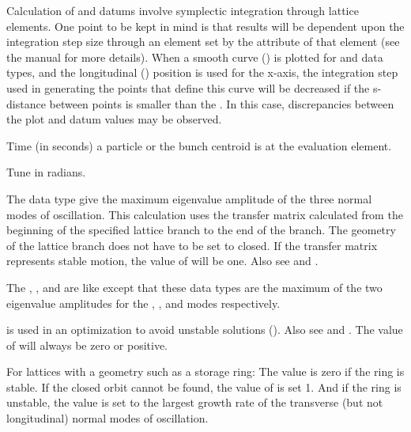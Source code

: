 \begin{description}
{{{{{{{{{Calculation of  and  datums involve symplectic integration
through lattice elements. One point to be kept in mind is that results will be dependent upon the
integration step size through an element set by the  attribute of that element (see the
\bmad manual for more details). When a smooth curve () is plotted for 
and  data types, and the longitudinal () position is used for the
x-axis, the integration step used in generating the points that define this curve will be decreased
if the s-distance between points is smaller than the .  In this case, discrepancies
between the plot and datum values may be observed.

  \item[time] \Newline {}
Time (in seconds) a particle or the bunch centroid is at the evaluation element.

  \item[tune.a, .b, .z] \Newline {}
Tune in radians.

  \item[unstable.eigen, unstable.eigen.a, .eigen.b, .eigen.c] \Newline {}
The  data type give the maximum eigenvalue amplitude of the three normal modes
of oscillation. This calculation uses the transfer matrix calculated from the beginning of the
specified lattice branch to the end of the branch. The geometry of the lattice branch does not have
to be set to closed. If the transfer matrix represents stable motion, the value of
 will be one. Also see  and .

The , , and  are like
 except that these data types are the maximum of the two eigenvalue amplitudes
for the , , and  modes respectively.

  \item[unstable.lattice] \Newline {}

 is used in an optimization to avoid unstable solutions ().
Also see  and .  The value of  will
always be zero or positive.

For lattices with a  geometry such as a storage ring: The value  is
zero if the ring is stable. If the closed orbit cannot be found, the value of 
is set 1. And if the ring is unstable, the value is set to the largest growth rate of the transverse
(but not longitudinal) normal modes of oscillation.

}}}}}}}}}
\end{description}
